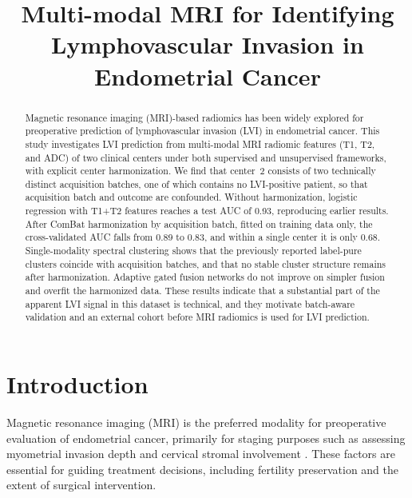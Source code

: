 \documentclass[conference]{IEEEtran}
\begin{document}
\title{Multi-modal MRI for Identifying Lymphovascular Invasion in Endometrial Cancer\\}

\author{
}

\maketitle

\begin{abstract}
Magnetic resonance imaging (MRI)-based radiomics has been widely explored for preoperative prediction of lymphovascular invasion (LVI) in endometrial cancer. This study investigates LVI prediction from multi-modal MRI radiomic features (T1, T2, and ADC) of two clinical centers under both supervised and unsupervised frameworks, with explicit center harmonization. We find that center~2 consists of two technically distinct acquisition batches, one of which contains no LVI-positive patient, so that acquisition batch and outcome are confounded. Without harmonization, logistic regression with T1+T2 features reaches a test AUC of 0.93, reproducing earlier results. After ComBat harmonization by acquisition batch, fitted on training data only, the cross-validated AUC falls from 0.89 to 0.83, and within a single center it is only 0.68. Single-modality spectral clustering shows that the previously reported label-pure clusters coincide with acquisition batches, and that no stable cluster structure remains after harmonization. Adaptive gated fusion networks do not improve on simpler fusion and overfit the harmonized data. These results indicate that a substantial part of the apparent LVI signal in this dataset is technical, and they motivate batch-aware validation and an external cohort before MRI radiomics is used for LVI prediction.
\end{abstract}

\section{Introduction}
Magnetic resonance imaging (MRI) is the preferred modality for preoperative evaluation of endometrial cancer, primarily for staging purposes such as assessing myometrial invasion depth and cervical stromal involvement \cite{ma2025predictive}. These factors are essential for guiding treatment decisions, including fertility preservation and the extent of surgical intervention.
\end{document}
